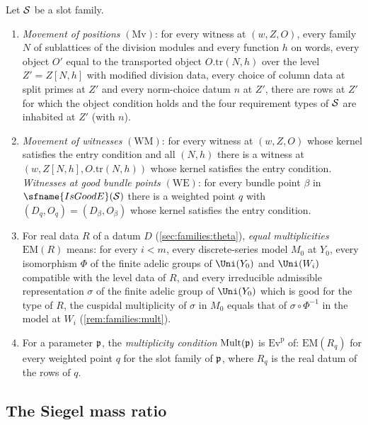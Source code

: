 \begin{definition}\label{pf:bundles:def:mult}
Let $\mathcal S$ be a slot family.
\begin{enumerate}[label=(\alph*)]
\item \emph{Movement of positions} $(\mathrm{Mv})$: for every witness at $(w,Z,O)$, every family $N$ of sublattices of the
division modules and every function $h$ on words, every object $O'$ equal to the transported object $O.\mathrm{tr}(N,h)$ over the
level $Z'=Z[N,h]$ with modified division data, every choice of column data at split primes at $Z'$ and every norm-choice datum
$n$ at $Z'$, there are rows at $Z'$ for which the object condition holds and the four requirement types of $\mathcal S$ are inhabited
at $Z'$ (with $n$).
\item \emph{Movement of witnesses} $(\mathrm{WM})$: for every witness at $(w,Z,O)$ whose kernel satisfies the entry condition and
all $(N,h)$ there is a witness at $(w,Z[N,h],O.\mathrm{tr}(N,h))$ whose kernel satisfies the entry condition. \emph{Witnesses at good
bundle points} $(\mathrm{WE})$: for every bundle point $\beta$ in $\sfname{IsGoodE}(\bundS)$ there is a weighted point $q$ with
$(D_q,O_q)=(D_\beta,O_\beta)$ whose kernel satisfies the entry condition.
\item For real data $R$ of a datum $D$ (\cref{sec:families:theta}), \emph{equal multiplicities} $\mathrm{EM}(R)$ means: for every
$i<m$, every discrete-series model $M_0$ at $Y_0$, every isomorphism $\Phi$ of the finite adelic groups of $\Uni(Y_0)$ and
$\Uni(W_i)$ compatible with the level data of $R$, and every irreducible admissible representation $\sigma$ of the finite adelic
group of $\Uni(Y_0)$ which is good for the type of $R$, the cuspidal multiplicity of $\sigma$ in $M_0$ equals that of
$\sigma\circ\Phi^{-1}$ in the model at $W_i$ (\cref{rem:families:mult}).
\item For a parameter $\mathfrak p$, the \emph{multiplicity condition} $\mathrm{Mult}(\mathfrak p)$ is $\mathrm{Ev}^{\mathrm p}$ of: $\mathrm{EM}(R_q)$
for every weighted point $q$ for the slot family of $\mathfrak p$, where $R_q$ is the real datum of the rows of $q$.
\end{enumerate}
\end{definition}

\subsection{The Siegel mass ratio}\label{pf:bundles:mass}


